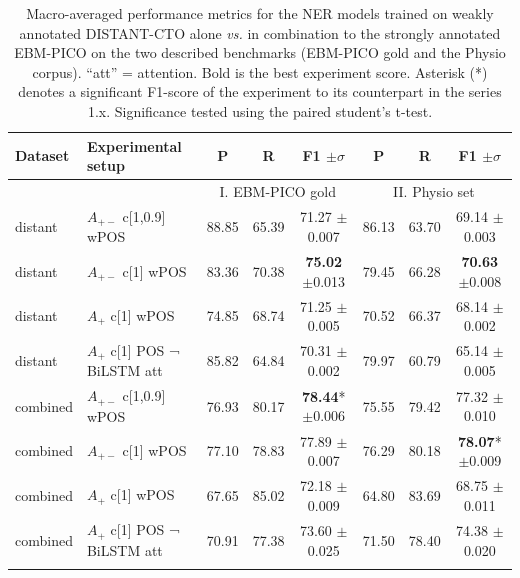 \documentclass[11pt]{article}
\begin{document}
\begin{table}[hbt!]
    \centering
    \begin{tabular}{llccc|ccc}
        \Xhline{1pt}
        Dataset & Experimental setup & P & R & F1 $\pm\sigma$ & P & R & F1 $\pm\sigma$\\
        \hline 
        & & \multicolumn{3}{c}{I. EBM-PICO gold} & \multicolumn{3}{c}{II. Physio set}  \\
        distant & $A_{+-}$ c[1,0.9] wPOS & 88.85 & 65.39 & 71.27 $\pm$0.007 & 86.13 & 63.70 & 69.14 $\pm$0.003\\
        distant & $A_{+-}$ c[1] wPOS  & 83.36 & 70.38 & \textbf{75.02} $\pm$0.013 & 79.45 & 66.28 & \textbf{70.63} $\pm$0.008\\
        distant & $A_{+}$ c[1] wPOS & 74.85 & 68.74 & 71.25 $\pm$0.005 & 70.52 & 66.37 & 68.14 $\pm$0.002 \\
        distant & $A_{+}$ c[1] POS ¬ BiLSTM att & 85.82 & 64.84 & 70.31 $\pm$0.002 & 79.97 & 60.79 & 65.14 $\pm$0.005 \\
        combined & $A_{+-}$ c[1,0.9] wPOS & 76.93  & 80.17  & \textbf{78.44}* $\pm$0.006 & 75.55  & 79.42 & 77.32 $\pm$0.010\\
        combined & $A_{+-}$ c[1] wPOS & 77.10 & 78.83 & 77.89 $\pm$0.007 & 76.29 & 80.18 & \textbf{78.07}* $\pm$0.009\\
        combined & $A_{+}$ c[1] wPOS & 67.65 & 85.02 & 72.18 $\pm$0.009  & 64.80 & 83.69 & 68.75 $\pm$0.011 \\
        combined & $A_{+}$ c[1] POS ¬ BiLSTM att & 70.91 & 77.38 & 73.60 $\pm$0.025 & 71.50 & 78.40 & 74.38 $\pm$0.020 \\
        \Xhline{1pt}
    \end{tabular}
    \caption{Macro-averaged performance metrics for the NER models trained on weakly annotated DISTANT-CTO alone \textit{vs.} in combination to the strongly annotated EBM-PICO on the two described benchmarks (EBM-PICO gold and the Physio corpus). ``att'' = attention. Bold is the best experiment score. Asterisk (*) denotes a significant F1-score of the experiment to its counterpart in the series 1.x. Significance tested using the paired student's t-test.}
    \label{tab:results_modeltraining}
\end{table}
%
%
%
%
%
%
\end{document}
